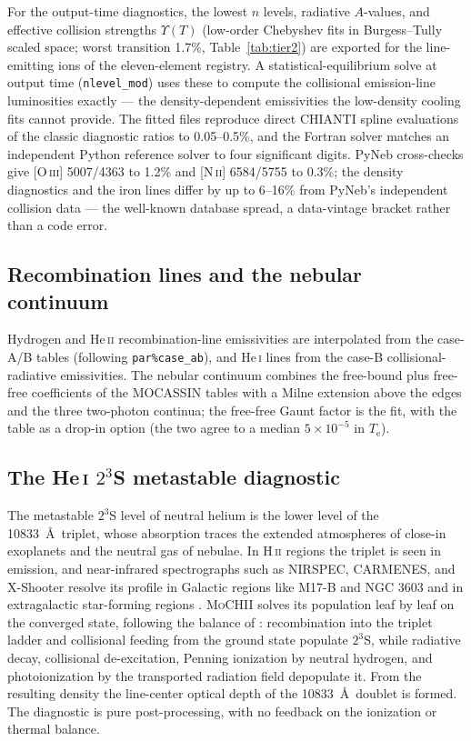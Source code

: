 \documentclass[twocolumn,linenumbers]{aastex702}
\newcommand{\code}[1]{\texttt{#1}}
\newcommand{\MoCHII}{\textsc{MoCHII}}
\newcommand{\HII}{H\,\textsc{ii}}
\newcommand{\HeI}{He\,\textsc{i}}
\newcommand{\HeII}{He\,\textsc{ii}}
\newcommand{\Te}{T_{\mathrm{e}}}
\begin{document}
For the
output-time diagnostics, the lowest $n$ levels, radiative $A$-values, and
effective collision strengths $\Upsilon(T)$ (low-order Chebyshev fits in
Burgess--Tully scaled space; worst transition 1.7\%,
Table~\ref{tab:tier2}) are exported for the line-emitting ions of the
eleven-element registry.  A statistical-equilibrium solve at output time
(\code{nlevel\_mod}) uses these to compute the collisional emission-line
luminosities exactly --- the density-dependent emissivities the
low-density cooling fits cannot provide.  The fitted files reproduce direct
CHIANTI spline evaluations of the classic diagnostic ratios to 0.05--0.5\%,
and the Fortran solver matches an independent Python reference solver to
four significant digits.  PyNeb cross-checks give [\textsc{O\,iii}]
5007/4363 to 1.2\% and [\textsc{N\,ii}] 6584/5755 to 0.3\%; the density
diagnostics and the iron lines differ by up to 6--16\% from PyNeb's
independent collision data --- the well-known database spread, a
data-vintage bracket rather than a code error.

\subsection{Recombination lines and the nebular continuum}
\label{sec:reclines}

Hydrogen and \HeII{} recombination-line emissivities are interpolated from
the \citet{storey1995} case-A/B tables (following \code{par\%case\_ab}),
and \HeI{} lines from the \citet{porter2012,porter2013} case-B
collisional-radiative emissivities.  The nebular continuum combines the
free-bound plus free-free coefficients of the MOCASSIN
\citep{ercolano2006} tables with a Milne extension above the edges and the
three two-photon continua; the free-free Gaunt factor is the
\citet{hummer1988} fit, with the \citet{vanhoof2014} table as a drop-in
option (the two agree to a median $5\times10^{-5}$ in $\Te$).

\subsection{The \HeI{} \texorpdfstring{$2^3$S}{2 3S} metastable diagnostic}
\label{sec:heimeta}

The metastable $2^3$S level of neutral helium is the lower level of the
10833~\AA\ triplet, whose absorption traces the extended atmospheres of
close-in exoplanets and the neutral gas of nebulae.  In \HII{} regions the
triplet is seen in emission, and near-infrared spectrographs such as
NIRSPEC, CARMENES, and X-Shooter resolve its profile in Galactic regions
like M17-B and NGC 3603 and in extragalactic star-forming regions
\citep{draine2026}.  \MoCHII{} solves its
population leaf by leaf on the converged state, following the balance of
\citet{oklopcic2018}: recombination into the triplet ladder and collisional
feeding from the ground state populate $2^3$S, while radiative decay,
collisional de-excitation, Penning ionization by neutral hydrogen, and
photoionization by the transported radiation field depopulate it.  From the
resulting density the line-center optical depth of the 10833~\AA\ doublet is
formed.  The diagnostic is pure post-processing, with no feedback on the
ionization or thermal balance.
\end{document}
